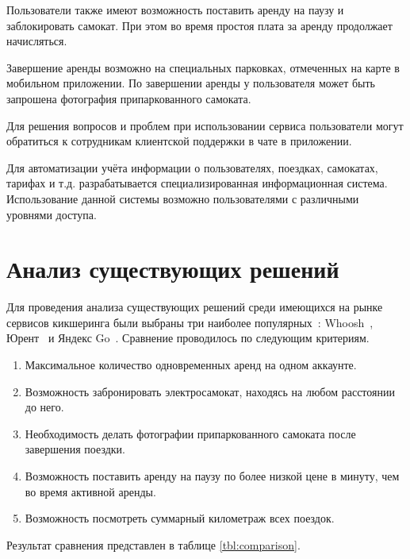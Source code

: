Пользователи также имеют возможность поставить аренду на паузу и заблокировать самокат. При этом во время простоя плата за аренду продолжает начисляться.

Завершение аренды возможно на специальных парковках, отмеченных на карте в мобильном приложении. По завершении аренды у пользователя может быть запрошена фотография припаркованного самоката.

Для решения вопросов и проблем при использовании сервиса пользователи могут обратиться к сотрудникам клиентской поддержки в чате в приложении.

Для автоматизации учёта информации о пользователях, поездках, самокатах, тарифах и т.д. разрабатывается специализированная информационная система. Использование данной системы возможно пользователями с различными уровнями доступа.

\section{Анализ существующих решений}

Для проведения анализа существующих решений среди имеющихся на рынке сервисов кикшеринга были выбраны три наиболее популярных~\cite{hype}: Whoosh~\cite{whoosh}, Юрент~\cite{urent} и Яндекс Go~\cite{yago}. Сравнение проводилось по следующим критериям.

\begin{enumerate}
    \item Максимальное количество одновременных аренд на одном аккаунте.
    \item Возможность забронировать электросамокат, находясь на любом расстоянии до него.
    \item Необходимость делать фотографии припаркованного самоката после завершения поездки.
    \item Возможность поставить аренду на паузу по более низкой цене в минуту, чем во время активной аренды.
    \item Возможность посмотреть суммарный километраж всех поездок.
\end{enumerate}

Результат сравнения представлен в таблице \ref{tbl:comparison}.

